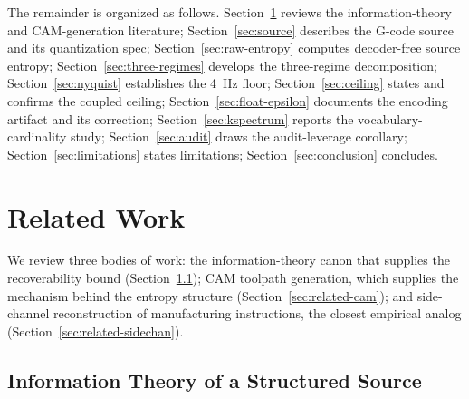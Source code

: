 \documentclass[entropy,article,submit,moreauthors,pdftex]{Definitions/mdpi}
\begin{document}
The remainder is organized as follows. Section~\ref{sec:related} reviews the information-theory and CAM-generation literature; Section~\ref{sec:source} describes the G-code source and its quantization spec; Section~\ref{sec:raw-entropy} computes decoder-free source entropy; Section~\ref{sec:three-regimes} develops the three-regime decomposition; Section~\ref{sec:nyquist} establishes the 4~Hz floor; Section~\ref{sec:ceiling} states and confirms the coupled ceiling; Section~\ref{sec:float-epsilon} documents the encoding artifact and its correction; Section~\ref{sec:kspectrum} reports the vocabulary-cardinality study; Section~\ref{sec:audit} draws the audit-leverage corollary; Section~\ref{sec:limitations} states limitations; Section~\ref{sec:conclusion} concludes.

\section{Related Work}
\label{sec:related}

We review three bodies of work: the information-theory canon that supplies the recoverability bound (Section~\ref{sec:related-it}); CAM toolpath generation, which supplies the mechanism behind the entropy structure (Section~\ref{sec:related-cam}); and side-channel reconstruction of manufacturing instructions, the closest empirical analog (Section~\ref{sec:related-sidechan}).

\subsection{Information Theory of a Structured Source}
\label{sec:related-it}
\end{document}
